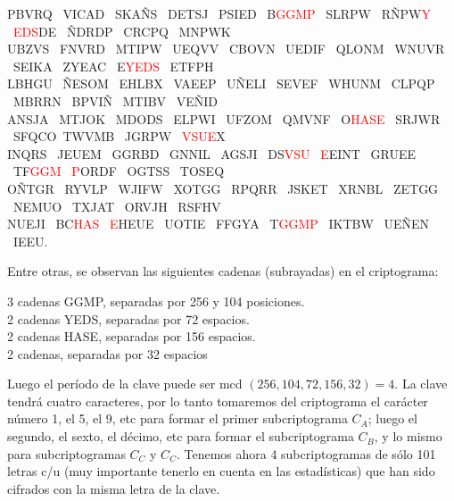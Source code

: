 \documentclass{article}
\begin{document}
PBVRQ \ VICAD \ SKAÑS \ DETSJ \ PSIED \ B\textcolor{red}{GGMP} \ SLRPW \ RÑPW\textcolor{red}{Y} \ \textcolor{red}{EDS}DE \ ÑDRDP \ CRCPQ \ MNPWK \\
UBZVS \ FNVRD \ MTIPW \ UEQVV \ CBOVN \ UEDIF \ QLONM \ WNUVR \ SEIKA \ ZYEAC \ E\textcolor{red}{YEDS} \ ETFPH \\
LBHGU \ ÑESOM \ EHLBX \ VAEEP \ UÑELI \ SEVEF \ WHUNM \ CLPQP \ MBRRN \ BPVIÑ \ MTIBV \ VEÑID \\
ANSJA \ MTJOK \ MDODS \ ELPWI \ UFZOM \ QMVNF \ O\textcolor{red}{HASE} \ SRJWR \ SFQCO\ TWVMB \ JGRPW \ \textcolor{red}{VSUE}X \\
INQRS \ JEUEM \ GGRBD \ GNNIL \ AGSJI \ DS\textcolor{red}{VSU} \ \textcolor{red}{E}EINT \ GRUEE \ TF\textcolor{red}{GGM} \ \textcolor{red}{P}ORDF \ OGTSS \ TOSEQ\\
OÑTGR \ RYVLP \ WJIFW \ XOTGG \ RPQRR \ JSKET \ XRNBL \ ZETGG \ NEMUO \ TXJAT \ ORVJH \ RSFHV \\
NUEJI \ BC\textcolor{red}{HAS} \ \textcolor{red}{E}HEUE \ UOTIE \ FFGYA \ T\textcolor{red}{GGMP} \ IKTBW \ UEÑEN \ IEEU.
 


\normalsize
Entre otras, se observan las siguientes cadenas (subrayadas) en el criptograma: 
\begin{center}
    3 cadenas GGMP, separadas por 256 y 104  posiciones. \\
    2 cadenas YEDS, separadas por 72 espacios.\\
    2 cadenas HASE, separadas por 156 espacios.\\
    2 cadenas, separadas por 32 espacios
\end{center}
\justify
Luego el período de la clave puede ser mcd $(256, 104, 72, 156, 32) = 4$. La clave tendrá cuatro caracteres, por lo tanto tomaremos del criptograma el carácter número 1, el 5, el 9, etc para formar el primer subcriptograma $C_{A}$; luego el segundo, el sexto, el décimo, etc para formar el subcriptograma $C_{B}$, y lo mismo para subcriptogramas $C_{C}$ y $C_{C}$.
Tenemos ahora 4 subcriptogramas de sólo 101 letras c/u (muy importante tenerlo en cuenta en las estadísticas) que han sido cifrados con la misma letra de la clave.  

\end{document}
